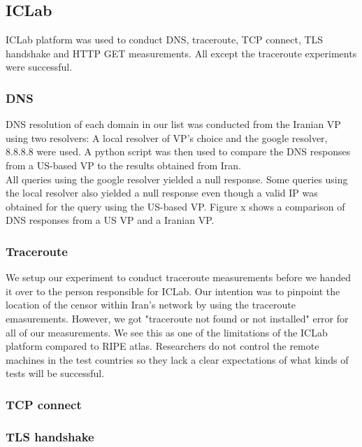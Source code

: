 \subsection{ICLab}
ICLab platform was used to conduct DNS, traceroute, TCP connect, TLS handshake and HTTP GET measurements. All except the traceroute experiments were successful.
\subsubsection{DNS} DNS resolution of each domain in our list was conducted from the Iranian VP using two resolvers: A local resolver of VP's choice and the google resolver, 8.8.8.8 were used. A python script was then used to compare the DNS responses from a US-based VP to the results obtained from Iran.\\ All queries using the google resolver yielded a null response. Some queries using the local resolver also yielded a null response even though a valid IP was obtained for the query using the US-based VP.  Figure \reminder x shows a comparison of DNS responses from a US VP and a Iranian VP.\\
\subsubsection{Traceroute} We setup our experiment to conduct traceroute measurements before we handed it over to the person responsible for ICLab. Our intention was to pinpoint the location of the censor within Iran’s network by using the traceroute emasurements. However, we got "traceroute not found or not installed" error for all of our measurements. We see this as one of the limitations of the ICLab platform compared to RIPE atlas. Researchers do not control the remote machines in the test countries so they lack a clear expectations of what kinds of tests will be successful. \\
\subsubsection{TCP connect} 
\subsubsection{TLS handshake}
